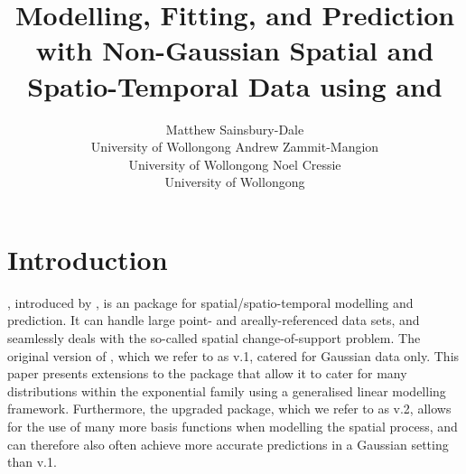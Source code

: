 \documentclass[article]{jss}
\author{Matthew Sainsbury-Dale\\University of Wollongong
   \And \quad\quad Andrew Zammit-Mangion\\\quad\quad University of Wollongong 
   \And Noel Cressie\\University of Wollongong}
\title{Modelling, Fitting, and Prediction with Non-Gaussian Spatial and Spatio-Temporal Data using \pkg{TMB} and \pkg{FRK}}
\newcommand{\red}[1]{\textcolor{red}{#1}}
\begin{document}
\sloppy %





\section{Introduction}\label{sec:intro}



, introduced by \cite{FRK_paper}, is an  \citep{Rcoreteam_2020} package for spatial/spatio-temporal modelling and prediction. It can handle large point- and areally-referenced data sets, and seamlessly deals with the so-called spatial change-of-support problem. 
 The original version of , which we refer to as  v.1, catered for Gaussian data only.
 This paper presents extensions to the package that allow it to cater for many distributions within the exponential family %
  using a generalised linear modelling framework.
Furthermore, the upgraded package, which we refer to as  v.2, allows for the use of many more basis functions when modelling the spatial process, and can therefore also often achieve more accurate predictions in a Gaussian setting than  v.1. 
\end{document}
